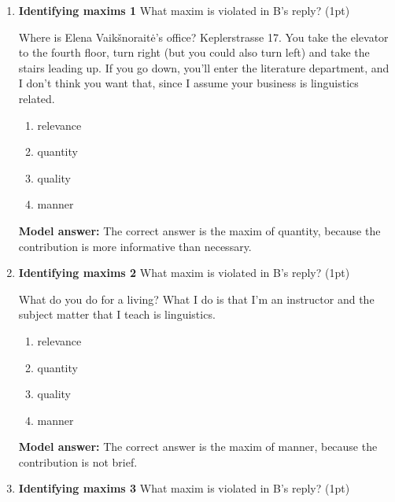 \documentclass[a4,11pt]{article}
\newcommand{\6}{\mbox{$[\hspace*{-.6mm}[$}}
\newcommand{\9}{\mbox{$]\hspace*{-.6mm}]$}}
\begin{document}
\begin{enumerate}[leftmargin = 12pt]
(b) and (d) are conversational implicatures because they are defeasible. The examples {\it That man is either Martha’s brother or her boyfriend. In fact, he is her boyfriend.} and {\it That’s a great joke – Ham, Shem and Japheth couldn’t stop laughing when they heard it from Noah. Actually, they haven't heard the joke before.} are not contradictory.


\item  { \bf Identifying maxims 1}  What maxim is violated in B's reply? (1pt)

\begin{exe}
 Where is Elena Vaik\v{s}norait\.{e}'s office?
 Keplerstrasse 17. You take the elevator to the fourth floor, turn right (but you could also turn left) and take the stairs leading up. If you go down, you’ll enter the literature department, and I don’t think you want that, since I assume your business is linguistics related.
\end{exe}

\begin{enumerate}[noitemsep]
\item relevance
\item quantity
\item quality
\item manner
\end{enumerate}

{ \bf Model answer:} The  correct answer is the maxim of quantity, because the contribution is more informative than necessary. 

\item  { \bf Identifying maxims 2} What maxim is violated in B's reply? (1pt)

\begin{exe}
 What do you do for a living?
 What I do is that I’m an instructor and the subject matter that I teach is linguistics.
\end{exe}

\begin{enumerate}[noitemsep]
\item relevance
\item quantity
\item quality
\item manner
\end{enumerate}


{ \bf Model answer:} The  correct answer is the maxim of manner, because the contribution is not brief.

\item  { \bf Identifying maxims 3}  What maxim is violated in B's reply? (1pt)



\end{enumerate}
\end{document}
